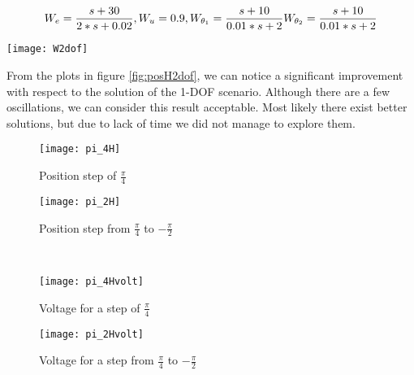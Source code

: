 \begin{equation}
	W_e=
	\frac{s+30}{2*s+0.02}
	\\
	,
	\\
	W_u=0.9
	\\
	,
	\\
	W_{\theta_{1}}=
	\frac{s+10}{0.01*s+2}
	\\
	W_{\theta_{2}}=
	\frac{s+10}{0.01*s+2}
\end{equation}

\begin{figure*}[h]
	\centering
	\texttt{[image: W2dof]}
	\caption{Weighting functions}
\end{figure*}

From the plots in figure \ref{fig:posH2dof}, we can notice a significant improvement with respect to the solution of the 1-DOF scenario. Although there are a few oscillations, we can consider this result acceptable. Most likely there exist better solutions, but due to lack of time we did not manage to explore them.

 \begin{figure*}[h]
	\centering
	\begin{subfigure}{0.5\columnwidth}
		\texttt{[image: pi\_4H]}
		\caption{Position step of $\frac{\pi}{4}$}
	\end{subfigure}
	\begin{subfigure}{0.45\columnwidth}
		\texttt{[image: pi\_2H]}
		\caption{Position step from $\frac{\pi}{4}$ to $-\frac{\pi}{2}$}
	\end{subfigure}
	\\
	\begin{subfigure}{0.5\columnwidth}
		\texttt{[image: pi\_4Hvolt]}
		\caption{Voltage for a step of $\frac{\pi}{4}$}
	\end{subfigure}
	\begin{subfigure}{0.45\columnwidth}
		\texttt{[image: pi\_2Hvolt]}
		\caption{Voltage for a step from $\frac{\pi}{4}$ to $-\frac{\pi}{2}$}
	\end{subfigure}
	\caption{Position steps response}
	\label{fig:posH2dof}
\end{figure*}




 


